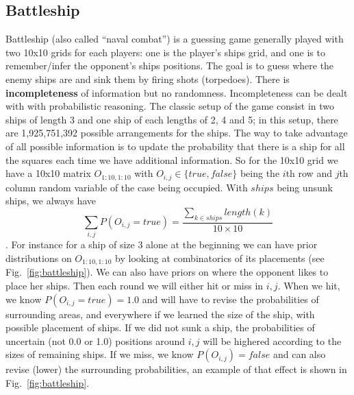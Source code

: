 \subsection{Battleship}
Battleship (also called ``naval combat'') is a guessing game generally played with two 10x10 grids for each players: one is the player's ships grid, and one is to remember/infer the opponent's ships positions. The goal is to guess where the enemy ships are and sink them by firing shots (torpedoes). There is \textbf{incompleteness} of information but no randomness. Incompleteness can be dealt with with probabilistic reasoning. The classic setup of the game consist in two ships of length 3 and one ship of each lengths of 2, 4 and 5; in this setup, there are 1,925,751,392 possible arrangements for the ships. The way to take advantage of all possible information is to update the probability that there is a ship for all the squares each time we have additional information. So for the 10x10 grid we have a 10x10 matrix $O_{1:10,1:10}$ with $O_{i,j} \in \{true,false\}$ being the $i$th row and $j$th column random variable of the case being occupied. With $ships$ being unsunk ships, we always have $$\sum_{i,j}P(O_{i,j}=true) = \frac{\sum_{k\in ships}length(k)}{10 \times 10}$$. For instance for a ship of size 3 alone at the beginning we can have prior distributions on $O_{1:10,1:10}$ by looking at combinatorics of its placements (see Fig.~\ref{fig:battleship}). We can also have priors on where the opponent likes to place her ships. Then each round we will either hit or miss in $i,j$. When we hit, we know $P(O_{i,j}=true)=1.0$ and will have to revise the probabilities of surrounding areas, and everywhere if we learned the size of the ship, with possible placement of ships. If we did not sunk a ship, the probabilities of uncertain (not 0.0 or 1.0) positions around $i,j$ will be highered according to the sizes of remaining ships. If we miss, we know $P(O_{i,j})=false$ and can also revise (lower) the surrounding probabilities, an example of that effect is shown in Fig.~\ref{fig:battleship}. 

